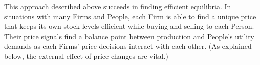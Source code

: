 This approach described above succeeds in finding efficient equilibria. In situations with many Firms and People, each Firm is able to find a unique price that keeps its own stock levels efficient while buying and selling to each Person. Their price signals find a balance point between production and People's utility demands as each Firms' price decisions interact with each other. (As explained below, the external effect of price changes are vital.)


